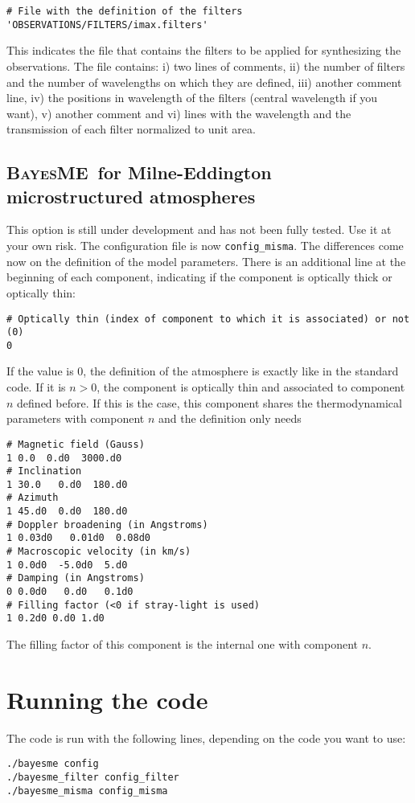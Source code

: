 \documentclass[12pt]{article}
\def\B{\textsc{BayesME}}
\begin{document}
\begin{verbatim}
# File with the definition of the filters
'OBSERVATIONS/FILTERS/imax.filters'
\end{verbatim}
This indicates the file that contains the filters to be applied for synthesizing
the observations. The file contains: i) two lines of comments, ii) the number of
filters and the number of wavelengths on which they are defined, iii) another comment
line, iv) the positions in wavelength of the filters (central wavelength if you want),
v) another comment and vi) lines with the wavelength and the transmission of each
filter normalized to unit area.

\subsection{\B\ for Milne-Eddington microstructured atmospheres}
This option is still under development and has not been fully tested.
Use it at your own risk. The configuration file is now \texttt{config\_misma}. The
differences come now on the definition of the model parameters. There is an
additional line at the beginning of each component, indicating if the
component is optically thick or optically thin:

\begin{verbatim}
# Optically thin (index of component to which it is associated) or not (0)
0
\end{verbatim}
If the value is 0, the definition of the atmosphere is exactly like in the
standard code. If it is $n>0$, the component is optically thin and associated
to component $n$ defined before. If this is the case, this component shares
the thermodynamical parameters with component $n$ and the definition only needs

\begin{verbatim}
# Magnetic field (Gauss)
1 0.0  0.d0  3000.d0
# Inclination
1 30.0   0.d0  180.d0
# Azimuth
1 45.d0  0.d0  180.d0
# Doppler broadening (in Angstroms)
1 0.03d0   0.01d0  0.08d0
# Macroscopic velocity (in km/s)
1 0.0d0  -5.0d0  5.d0
# Damping (in Angstroms)
0 0.0d0   0.d0   0.1d0
# Filling factor (<0 if stray-light is used)
1 0.2d0 0.d0 1.d0
\end{verbatim}
The filling factor of this component is the internal one with component $n$.

\section{Running the code}
The code is run with the following lines, depending on the code you want
to use:
\begin{verbatim}
./bayesme config
./bayesme_filter config_filter
./bayesme_misma config_misma
\end{verbatim}
\end{document}

